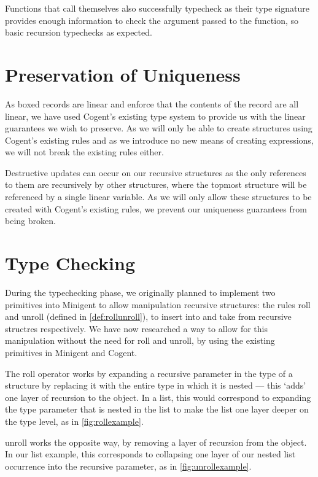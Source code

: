 Functions that call themselves also successfully typecheck as their type signature provides enough information
to check the argument passed to the function, so basic recursion typechecks as expected.

\section{Preservation of Uniqueness}

As boxed records are linear and enforce that the contents of the record are all linear, we
have used Cogent's existing type system to provide us with the linear guarantees we wish to preserve.
As we will only be able to create structures using Cogent's existing rules and as we introduce
no new means of creating expressions, we will not break the existing rules either. 

Destructive updates can occur on our recursive structures as the only references to them are
recursively by other structures, where the topmost structure will be referenced by a single linear
variable. As we will only allow these structures to be created with Cogent's existing rules,
we prevent our uniqueness guarantees from being broken.

\section{Type Checking}
\label{sec:typecheckingprogress}

During the typechecking phase, we originally planned to implement two primitives into Minigent to allow manipulation
recursive structures: the rules \textsf{roll} and \textsf{unroll} (defined in \autoref{def:rollunroll}),
to insert into and take from recursive structres respectively. We have now researched a way to allow
for this manipulation without the need for \textsf{roll} and \textsf{unroll}, by using the existing primitives
in Minigent and Cogent.

The \textsf{roll} operator works by expanding a recursive parameter 
in the type of a structure by replacing it with the entire type in which it is nested --- this `adds' one 
layer of recursion to the object. In a list, this would correspond to expanding the type parameter
that is nested in the list to make the list one layer deeper on the type level, as in \autoref{fig:rollexample}.

\textsf{unroll} works the opposite way, by removing a layer of recursion from the object. In our
list example, this corresponds to collapsing one layer of our nested list occurrence into the
recursive parameter, as in \autoref{fig:unrollexample}. 

